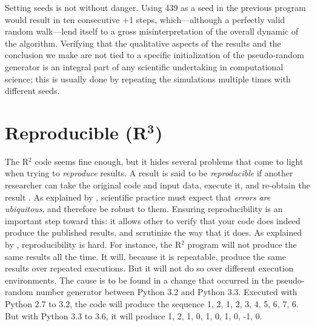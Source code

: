 \documentclass[a4paper,11pt]{article}
\begin{document}
Setting seeds is not without danger. Using 439 as a seed in the previous program would result in ten consecutive +1 steps, which---although a perfectly valid random walk---lend itself to a gross misinterpretation of the overall dynamic of the algorithm. Verifying that the qualitative aspects of the results and the conclusion we make are not tied to a specific initialization of the pseudo-random generator is an integral part of any scientific undertaking in computational science; 
this is usually done by repeating the simulations multiple times with different seeds.  




\section*{Reproducible (R$^{\mathbf 3}$)}

The R$^2$ code seems fine enough, but it hides several problems that come to light when trying to {\em reproduce} results. A result is said to be \emph{reproducible} if another researcher can take the original code and input data, execute it, and re-obtain the result \parencite{Peng:2006}. As explained by \citeauthor{Donoho:2009} \parencite{Donoho:2009}, scientific practice must expect that {\em errors are ubiquitous}, and therefore be robust to them. Ensuring reproducibility is an important step toward this: it allows other to verify that your code does indeed produce the published results, and scrutinize the way that it does. As explained by \citeauthor{Mesnard:2016} \citep{Mesnard:2016}, reproducibility is hard.  For instance, the R$^2$ program will not produce the same results all the time. It will, because it is repeatable, produce the same results over repeated executions. But it will not do so over different execution environments. The cause is to be found in a change that occurred in the pseudo-random number generator between Python 3.2 and Python 3.3. Executed with Python 2.7 to 3.2, the code will produce the sequence 1, 2, 1, 2, 3, 4, 5, 6, 7, 6. But with Python 3.3 to 3.6, it will produce 1, 2, 1, 0, 1, 0, 1, 0, -1, 0.\\
\end{document}
